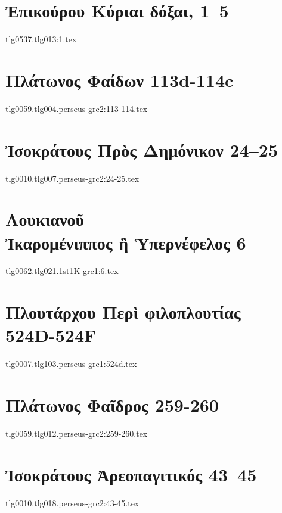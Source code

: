 \documentclass[a4paper,12pt,twoside]{report}
\begin{document}
\chapter[Ἐπικούρου Κύριαι δόξαι]{\textgreek[variant=ancient]{Ἐπικούρου Κύριαι δόξαι,} 1–5}
{tlg0537.tlg013:1.tex}

\chapter[Πλάτωνος Φαίδων]{\textgreek[variant=ancient]{Πλάτωνος Φαίδων} 113d-114c}
{tlg0059.tlg004.perseus-grc2:113-114.tex}

\chapter[Ἰσοκράτους Πρὸς Δημόνικον]{\textgreek[variant=ancient]{Ἰσοκράτους Πρὸς Δημόνικον} 24–25}
{tlg0010.tlg007.perseus-grc2:24-25.tex}

\chapter[Λουκιανοῦ Ἰκαρομένιππος]{\textgreek[variant=ancient]{Λουκιανοῦ \\Ἰκαρομένιππος ἢ Ὑπερνέφελος} 6}
{tlg0062.tlg021.1st1K-grc1:6.tex}

\chapter[Πλουτάρχου Περὶ φιλοπλουτίας]{\textgreek[variant=ancient]{Πλουτάρχου Περὶ φιλοπλουτίας} \\524D-524F}
{tlg0007.tlg103.perseus-grc1:524d.tex}

\chapter[Πλάτωνος Φαῖδρος]{\textgreek[variant=ancient]{Πλάτωνος Φαῖδρος} 259-260}
{tlg0059.tlg012.perseus-grc2:259-260.tex}

\chapter[Ἰσοκράτους Ἀρεοπαγιτικός]{\textgreek[variant=ancient]{Ἰσοκράτους Ἀρεοπαγιτικός} 43–45}
{tlg0010.tlg018.perseus-grc2:43-45.tex}
\end{document}
